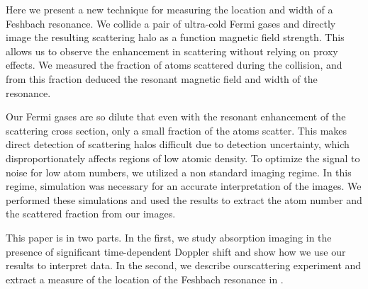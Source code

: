 \documentclass[12pt]{iopart}
\begin{document}
\par Here we present a new technique for measuring the location and width of a Feshbach resonance. We collide a pair of ultra-cold Fermi gases and directly image the resulting \swave scattering halo as a function magnetic field strength. This allows us to observe the enhancement in scattering without relying on proxy effects. We measured the fraction of atoms scattered during the collision, and from this fraction deduced the resonant magnetic field  and width of the resonance.
\par Our Fermi gases are so dilute that even with the resonant enhancement of the scattering cross section, only a small fraction of the atoms scatter. This makes direct detection of \swave scattering halos difficult due to detection uncertainty, which disproportionately affects regions of low atomic density. To optimize the signal to noise for low atom numbers, we utilized a non standard imaging regime. In this regime, simulation was necessary for an accurate interpretation of the images. We performed these simulations and used the results to extract the atom number and the scattered fraction from our images.
\par This paper is in two parts. In the first, we study absorption imaging in the presence of significant time-dependent Doppler shift and show how we use our results to interpret data. In the second, we describe our\swave scattering experiment and extract a measure of the location of the Feshbach resonance in \K. 
\end{document}
